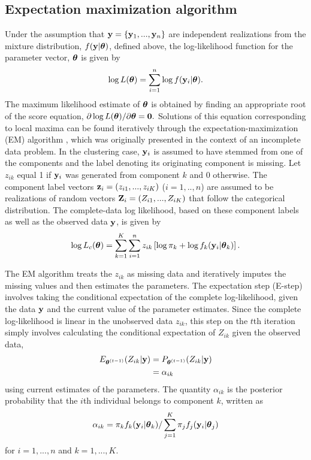 \subsection{Expectation maximization algorithm}\label{subsec:em}
Under the assumption that $\mathbf y = \{\mathbf y_{1},...,\mathbf y_{n}\}$ are independent realizations from the mixture distribution, $f(\mathbf y | \boldsymbol\theta)$, defined above, the log-likelihood function for the parameter vector, $\boldsymbol \theta$ is given by
$$\log L(\boldsymbol\theta)=\sum^{n}_{i=1}\log f(\mathbf y_{i}|\boldsymbol \theta).$$
The maximum likelihood estimate of $\boldsymbol\theta$ is obtained by finding an appropriate root of the score equation, $\partial \log L(\boldsymbol\theta)/\partial \boldsymbol\theta=\mathbf 0.$ Solutions of this equation corresponding to local maxima can be found iteratively through the expectation-maximization (EM) algorithm \cite{dempster1977}, which was originally presented in the context of an incomplete data problem. In the clustering case, $\mathbf y_{i}$ is assumed to have stemmed from one of the components and the label denoting its originating component is missing. Let $z_{ik}$ equal 1 if $\mathbf y_{i}$ was generated from component $k$ and 0 otherwise. The component label vectors $\mathbf z_{i}=(z_{i1},...,z_{iK})$ ($i=1,..,n$) are assumed to be realizations of random vectors $\mathbf Z_{i}=(Z_{i1},...,Z_{iK})$ that follow the categorical distribution. The complete-data log likelihood, based on these component labels as well as the observed data $\mathbf y$, is given by
$$\log L_{c}(\boldsymbol \theta) =  \sum^{K}_{k=1}\sum^{n}_{i=1}z_{ik}\left[\log \pi_{k}+\log f_{k}(\mathbf y_{i}|\boldsymbol\theta_k)\right].$$

The EM algorithm treats the $z_{ik}$ as missing data and iteratively imputes the missing values and then  estimates the parameters. The expectation step (E-step) involves taking the conditional expectation of the complete log-likelihood, given the data $\mathbf y$ and the current value of the parameter estimates. Since the complete log-likelihood is linear in the unobserved data $z_{ik}$, this step on the $t$th iteration simply involves calculating the conditional expectation of $Z_{ik}$ given the observed data,
\begin{align*}
E_{\boldsymbol\theta^{(t-1)}}( Z_{ik}|\mathbf y) &= P_{\boldsymbol\theta^{(t-1)}}( Z_{ik}|\mathbf y)\\
&=\alpha_{ik}
\end{align*}
using current estimates of the parameters. The quantity $\alpha_{ik}$ is the posterior probability that the $i$th individual belongs to component $k$, written as
$$\alpha_{ik}=\pi_{k}f_{k}(\mathbf y_{i}|\boldsymbol\theta_{k})/\sum_{j=1}^{K}\pi_{j}f_{j}(\mathbf y_{i}|\boldsymbol \theta_{j})$$
for $i=1,...,n$ and $k=1,...,K$.

